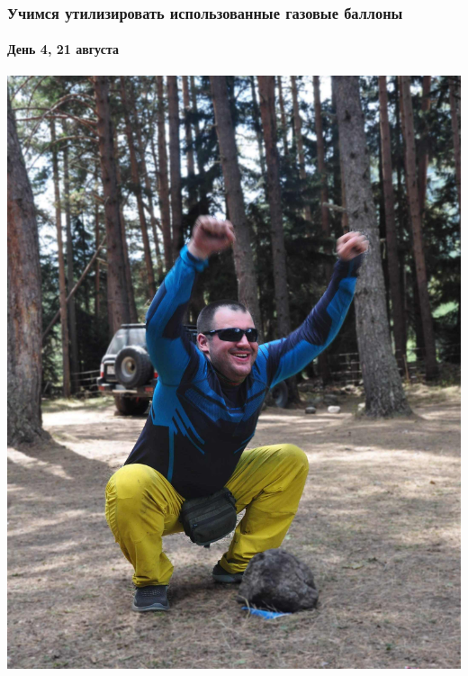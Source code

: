 \begin{frame}
	\frametitle{Учимся утилизировать использованные газовые баллоны \smiley}
	\framesubtitle{День 4, 21 августа}
	{\tiny
		\begin{minipage}{\fourpicsize}
			\centering
			\includegraphics[width=\textwidth]{../pics/DSC_1150}			
		\end{minipage}
		\hfill
		\begin{minipage}{\fourpicsize}
			\centering

\end{minipage}}
\end{frame}
